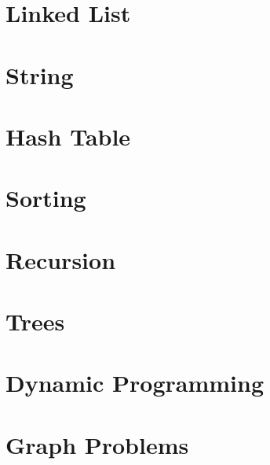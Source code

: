 \documentclass{article}
\begin{document}
\section{Linked List}
\section{String}
\section{Hash Table}
\section{Sorting}
\section{Recursion}
\section{Trees}
\section{Dynamic Programming}
\section{Graph Problems}
\end{document}
